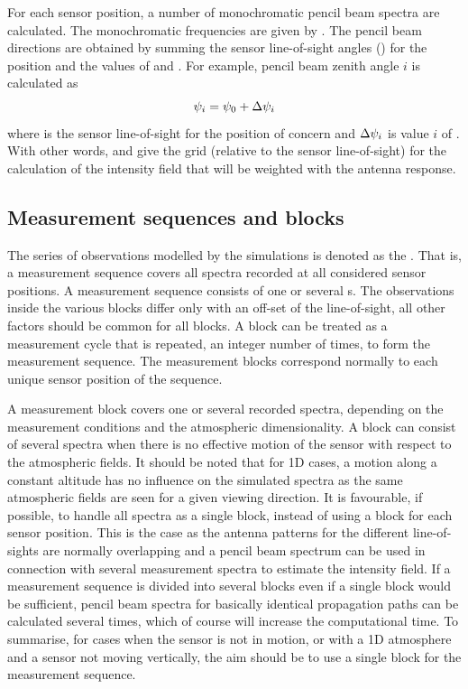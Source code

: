 For each sensor position, a number of monochromatic pencil beam
spectra are calculated. The monochromatic frequencies are given by
. The pencil
beam directions are obtained by summing the sensor line-of-sight
angles () for the position and the values of
 and . For
example, pencil beam zenith angle $i$ is calculated as
\begin{equation}
  \psi_{i} = \psi_{0} + \Delta\psi_{i}
  \label{eq:fm_defs:psi_grid}
\end{equation}
where  is the sensor line-of-sight for the position of
concern and $\Delta\psi_{i}$ is value $i$ of
.  With other words,
 and  give
the grid (relative to the sensor line-of-sight) for the calculation of
the intensity field that will be weighted with the antenna response.


\subsection{Measurement sequences and blocks}
\label{sec:fm_defs:seqsandblocks}

The series of observations modelled by the simulations is denoted as
the . That is, a measurement sequence
covers all spectra recorded at all considered sensor positions. A
measurement sequence consists of one or several s. The observations inside the various blocks differ only with
an off-set of the line-of-sight, all other factors should be common
for all blocks. A block can be treated as a measurement cycle that is
repeated, an integer number of times, to form the measurement
sequence.  The measurement blocks correspond normally to each unique
sensor position of the sequence.

A measurement block covers one or several recorded spectra, depending
on the measurement conditions and the atmospheric dimensionality. A
block can consist of several spectra when there is no effective motion
of the sensor with respect to the atmospheric fields. It should be
noted that for 1D cases, a motion along a constant altitude has no
influence on the simulated spectra as the same atmospheric fields are
seen for a given viewing direction. It is favourable, if possible, to
handle all spectra as a single block, instead of using a block for
each sensor position. This is the case as the antenna patterns for the
different line-of-sights are normally overlapping and a pencil beam
spectrum can be used in connection with several measurement spectra to
estimate the intensity field. If a measurement sequence is divided
into several blocks even if a single block would be sufficient, pencil
beam spectra for basically identical propagation paths can be
calculated several times, which of course will increase the
computational time. To summarise, for cases when the sensor is not in
motion, or with a 1D atmosphere and a sensor not moving vertically,
the aim should be to use a single block for the measurement sequence.


